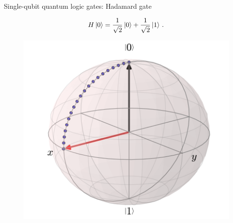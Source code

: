 \documentclass[10pt]{beamer}
\begin{document}
{
\begin{frame}[fragile]{Single-qubit quantum logic gates: Hadamard gate}

\begin{equation}
H \ket{0} = \frac{1}{\sqrt{2}} \ket{0} + \frac{1}{\sqrt{2}} \ket{1}\, .
\end{equation}

\begin{figure}
\includegraphics[scale=0.5]{blochhadamard.png}
\end{figure}

\end{frame}
}
\end{document}
